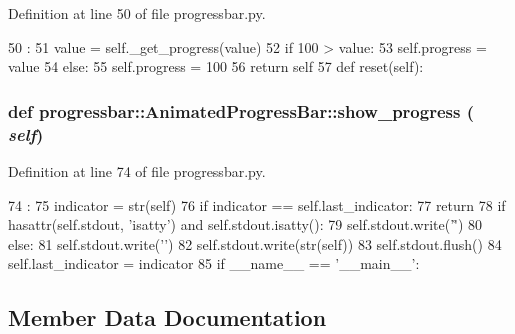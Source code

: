 Definition at line 50 of file progressbar.py.


\begin{DoxyCode}
50                         :
51         value = self._get_progress(value)
52         if 100 > value:
53             self.progress = value 
54         else:
55             self.progress = 100
56         return self
57 
    def reset(self):
\end{DoxyCode}
\hypertarget{classprogressbar_1_1AnimatedProgressBar_a2b4fc789e3220d4ed1e1b9d538776c92}{
\subsubsection[{show\_\-progress}]{\setlength{\rightskip}{0pt plus 5cm}def progressbar::AnimatedProgressBar::show\_\-progress ( {\em self})}}
\label{classprogressbar_1_1AnimatedProgressBar_a2b4fc789e3220d4ed1e1b9d538776c92}


Definition at line 74 of file progressbar.py.


\begin{DoxyCode}
74                            :
75         indicator = str(self)
76         if indicator == self.last_indicator:
77           return
78         if hasattr(self.stdout, 'isatty') and self.stdout.isatty():
79             self.stdout.write('\r')
80         else:
81             self.stdout.write('\n')
82         self.stdout.write(str(self))
83         self.stdout.flush()
84         self.last_indicator = indicator
85 
if __name__ == '__main__':
\end{DoxyCode}


\subsection{Member Data Documentation}
\hypertarget{classprogressbar_1_1ProgressBar_adb0492e85eacafa26a86c115791e5708}{
\subsubsection[{blank}]{}}
\label{classprogressbar_1_1ProgressBar_adb0492e85eacafa26a86c115791e5708}


